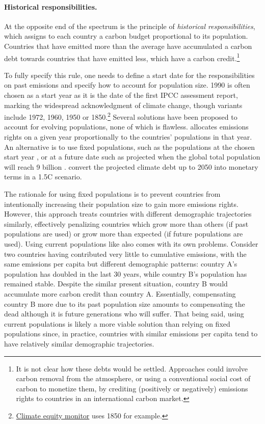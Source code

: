 \paragraph{Historical responsibilities.} At the opposite end of the spectrum is the principle of \textit{historical responsibilities}, which assigns to each country a carbon budget proportional to its population. Countries that have emitted more than the average have accumulated a carbon debt towards countries that have emitted less, which have a carbon credit.\footnote{It is not clear how these debts would be settled. Approaches could involve carbon removal from the atmosphere, or using a conventional social cost of carbon to monetize them, by crediting (positively or negatively) emissions rights to countries in an international carbon market.} 

To fully specify this rule, one needs to define a start date for the responsibilities on past emissions and specify how to account for population size. 1990 is often chosen as a start year as it is the date of the first IPCC assessment report, marking the widespread acknowledgment of climate change, though variants include 1972, 1960, 1950 or 1850.\footnote{\href{https://climateequitymonitor.in}{Climate equity monitor} uses 1850 for example.} Several solutions have been proposed to account for evolving populations, none of which is flawless. \citet{matthews_quantifying_2015} allocates emissions rights on a given year proportionally to the countries' populations in that year. An alternative is to use fixed populations, such as the populations at the chosen start year \citep{neumayer_defence_2000}, or at a future date such as projected when the global total population will reach 9 billion \citep{raupach_sharing_2014}. \citet{fanning_compensation_2023} convert the projected climate debt up to 2050 into monetary terms in a 1.5\textdegree{}C scenario.%

The rationale for using fixed populations is to prevent countries from intentionally increasing their population size to gain more emissions rights. However, this approach treats countries with different demographic trajectories similarly, effectively penalizing countries which grow more than others (if past populations are used) or grow more than expected (if future populations are used). Using current populations like \citet{matthews_quantifying_2015} also comes with its own problems. Consider two countries having contributed very little to cumulative emissions, with the same emissions per capita but different demographic patterns: country A's population has doubled in the last 30 years, while country B's population has remained stable. Despite the similar present situation, country B would accumulate more carbon credit than country A. Essentially, compensating country B more due to its past population size amounts to compensating the dead although it is future generations who will suffer. That being said, using current populations is likely a more viable solution than relying on fixed populations since, in practice, countries with similar emissions per capita tend to have relatively similar demographic trajectories.

